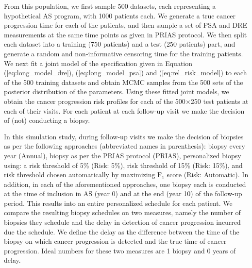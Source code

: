 From this population, we first sample 500 datasets, each representing a hypothetical AS program, with 1000 patients each. We generate a true cancer progression time for each of the patients, and then sample a set of PSA and DRE measurements at the same time points as given in PRIAS protocol. We then split each dataset into a training (750 patients) and a test (250 patients) part, and generate a random and non‐informative censoring time for the training patients. We next fit a joint model of the specification given in Equation (\ref{eq:long_model_dre}), (\ref{eq:long_model_psa}) and (\ref{eq:rel_risk_model}) to each of the 500 training datasets and obtain MCMC samples from the 500 sets of the posterior distribution of the parameters. Using these fitted joint models, we obtain the cancer progression risk profiles for each of the 500$\times$250 test patients at each of their visits. For each patient at each follow-up visit we make the decision of (not) conducting a biopsy. 

In this simulation study, during follow-up visits we make the decision of biopsies as per the following approaches (abbreviated names in parenthesis): biopsy every year (Annual), biopsy as per the PRIAS protocol (PRIAS), personalized biopsy using: a risk threshold of 5\% (Risk: 5\%), risk threshold of 15\% (Risk: 15\%), and risk threshold chosen automatically by maximizing $\mbox{F}_1$ score (Risk: Automatic). In addition, in each of the aforementioned approaches, one biopsy each is conducted at the time of inclusion in  AS (year 0) and at the end (year 10) of the follow-up period. This results into an entire personalized schedule for each patient. We compare the resulting biopsy schedules on two measures, namely the number of biopsies they schedule and the delay in detection of cancer progression incurred due the schedule. We define the delay as the difference between the time of the biopsy on which cancer progression is detected and the true time of cancer progression. Ideal numbers for these two measures are 1 biopsy and 0 years of delay.